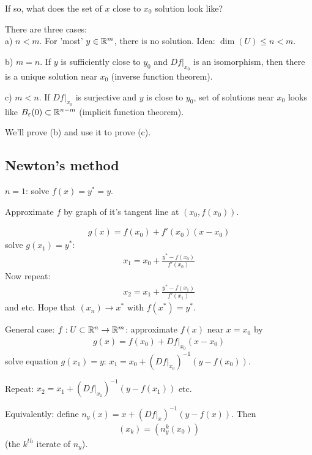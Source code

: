 \documentclass[a4paper]{article}
\begin{document}
If so, what does the set of $x$ close to $x_0$ solution look like?

There are three cases:\\
a) $n<m$. For 'most' $y \in \mathbb{R}^m$, there is no solution. Idea: $\dim(U) \leq n < m$.

b) $m=n$. If $y$ is sufficiently close to $y_0$ and $Df|_{x_0}$ is an isomorphism, then there is a unique solution near $x_0$ (inverse function theorem).

c) $m<n$. If $Df|_{x_0}$ is surjective and $y$ is close to $y_0$, set of solutions near $x_0$ looks like $B_{\varepsilon} (0) \subset \mathbb{R}^{n-m}$ (implicit function theorem).

We'll prove (b) and use it to prove (c).

\subsection{Newton's method}
$n=1$: solve $f(x)=y^*=y$.

Approximate $f$ by graph of it's tangent line at $(x_0,f(x_0))$.

\begin{equation*}
\begin{aligned}
g(x)=f(x_0)+f'(x_0)(x-x_0)
\end{aligned}
\end{equation*}
solve $g(x_1)=y^*$:
\begin{equation*}
\begin{aligned}
x_1=x_0+\frac{y^*-f(x_0)}{f'(x_0)}
\end{aligned}
\end{equation*}
Now repeat:
\begin{equation*}
\begin{aligned}
x_2=x_1+\frac{y^*-f(x_1)}{f'(x_1)}
\end{aligned}
\end{equation*}
and etc. Hope that $(x_n) \to x^*$ with $f(x^*) = y^*$.

General case: $f: U \subset \mathbb{R}^n \to \mathbb{R}^m$: approximate $f(x)$ near $x=x_0$ by
\begin{equation*}
\begin{aligned}
g(x)=f(x_0)+Df|_{x_0}(x-x_0)
\end{aligned}
\end{equation*}
solve equation $g(x_1)=y$: $x_1=x_0+(Df|_{x_0})^{-1}(y-f(x_0))$.

Repeat: $x_2=x_1+(Df|_{x_1})^{-1}(y-f(x_1))$ etc.

Equivalently: define $n_y(x)=x+(Df|_x)^{-1}(y-f(x))$. Then
\begin{equation*}
\begin{aligned}
(x_k)=(n^k_y(x_0))
\end{aligned}
\end{equation*}
(the $k^{th}$ iterate of $n_y$).
\end{document}
